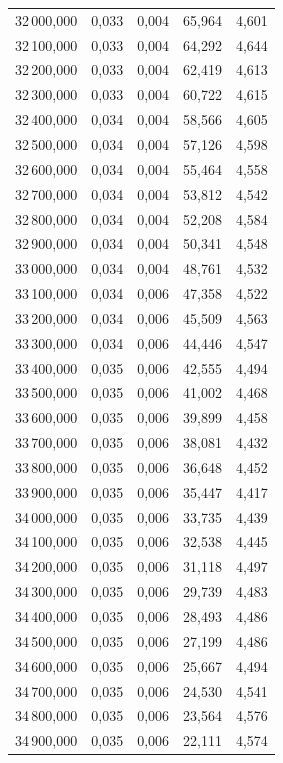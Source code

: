 \begin{longtable}{rrrrr}
32\,000,000 & 0,033 & 0,004 & 65,964 & 4,601\\
32\,100,000 & 0,033 & 0,004 & 64,292 & 4,644\\
32\,200,000 & 0,033 & 0,004 & 62,419 & 4,613\\
32\,300,000 & 0,033 & 0,004 & 60,722 & 4,615\\
32\,400,000 & 0,034 & 0,004 & 58,566 & 4,605\\
32\,500,000 & 0,034 & 0,004 & 57,126 & 4,598\\
32\,600,000 & 0,034 & 0,004 & 55,464 & 4,558\\
32\,700,000 & 0,034 & 0,004 & 53,812 & 4,542\\
32\,800,000 & 0,034 & 0,004 & 52,208 & 4,584\\
32\,900,000 & 0,034 & 0,004 & 50,341 & 4,548\\
33\,000,000 & 0,034 & 0,004 & 48,761 & 4,532\\
33\,100,000 & 0,034 & 0,006 & 47,358 & 4,522\\
33\,200,000 & 0,034 & 0,006 & 45,509 & 4,563\\
33\,300,000 & 0,034 & 0,006 & 44,446 & 4,547\\
33\,400,000 & 0,035 & 0,006 & 42,555 & 4,494\\
33\,500,000 & 0,035 & 0,006 & 41,002 & 4,468\\
33\,600,000 & 0,035 & 0,006 & 39,899 & 4,458\\
33\,700,000 & 0,035 & 0,006 & 38,081 & 4,432\\
33\,800,000 & 0,035 & 0,006 & 36,648 & 4,452\\
33\,900,000 & 0,035 & 0,006 & 35,447 & 4,417\\
34\,000,000 & 0,035 & 0,006 & 33,735 & 4,439\\
34\,100,000 & 0,035 & 0,006 & 32,538 & 4,445\\
34\,200,000 & 0,035 & 0,006 & 31,118 & 4,497\\
34\,300,000 & 0,035 & 0,006 & 29,739 & 4,483\\
34\,400,000 & 0,035 & 0,006 & 28,493 & 4,486\\
34\,500,000 & 0,035 & 0,006 & 27,199 & 4,486\\
34\,600,000 & 0,035 & 0,006 & 25,667 & 4,494\\
34\,700,000 & 0,035 & 0,006 & 24,530 & 4,541\\
34\,800,000 & 0,035 & 0,006 & 23,564 & 4,576\\
34\,900,000 & 0,035 & 0,006 & 22,111 & 4,574\\

\end{longtable}
